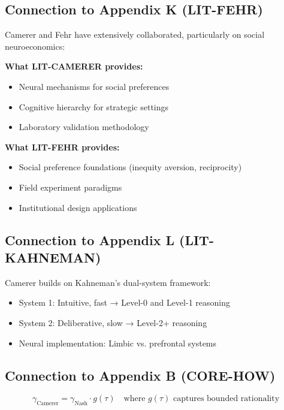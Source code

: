 \subsection{Connection to Appendix K (LIT-FEHR)}

Camerer and Fehr have extensively collaborated, particularly on social neuroeconomics:

\begin{tcolorbox}[colback=yellow!5!white, colframe=yellow!75!black,
    title=Integration: LIT-CAMERER $\leftrightarrow$ LIT-FEHR]
\textbf{What LIT-CAMERER provides:}
\begin{itemize}[nosep]
\item Neural mechanisms for social preferences
\item Cognitive hierarchy for strategic settings
\item Laboratory validation methodology
\end{itemize}

\textbf{What LIT-FEHR provides:}
\begin{itemize}[nosep]
\item Social preference foundations (inequity aversion, reciprocity)
\item Field experiment paradigms
\item Institutional design applications
\end{itemize}
\end{tcolorbox}

\subsection{Connection to Appendix L (LIT-KAHNEMAN)}

Camerer builds on Kahneman's dual-system framework:

\begin{itemize}[nosep]
\item System 1: Intuitive, fast → Level-0 and Level-1 reasoning
\item System 2: Deliberative, slow → Level-2+ reasoning
\item Neural implementation: Limbic vs. prefrontal systems
\end{itemize}

\subsection{Connection to Appendix B (CORE-HOW)}

\begin{equation}
\gamma_{\text{Camerer}} = \gamma_{\text{Nash}} \cdot g(\tau) \quad \text{where } g(\tau) \text{ captures bounded rationality}
\end{equation}


